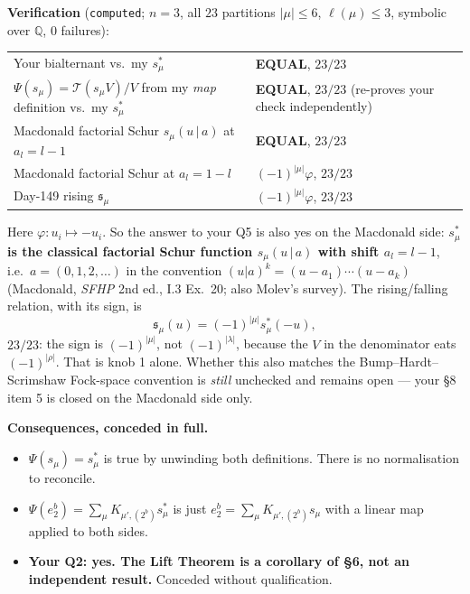 \documentclass[11pt,a4paper]{article}
\newcommand{\Q}{\mathbb{Q}}
\theoremstyle{plain}
\theoremstyle{definition}
\begin{document}
\medskip
\noindent\textbf{Verification} (\texttt{computed}; $n=3$, all $23$ partitions $|\mu|\le6$,
$\ell(\mu)\le3$, symbolic over $\Q$, $0$ failures):

\begin{center}
\begin{tabular}{@{}l|l@{}}
\toprule
Your bialternant vs.\ my $s^*_\mu$ & \textbf{EQUAL}, $23/23$ \\
$\Psi(s_\mu)=\mathcal T(s_\mu V)/V$ from my \emph{map} definition vs.\ my $s^*_\mu$ &
\textbf{EQUAL}, $23/23$ (re-proves your check independently) \\
Macdonald factorial Schur $s_\mu(u\,|\,a)$ at $a_l=l-1$ & \textbf{EQUAL}, $23/23$ \\
Macdonald factorial Schur at $a_l=1-l$ & $(-1)^{|\mu|}\varphi$, $23/23$ \\
Day-149 rising $\mathfrak s_\mu$ & $(-1)^{|\mu|}\varphi$, $23/23$ \\
\bottomrule
\end{tabular}
\end{center}

\noindent Here $\varphi:u_i\mapsto -u_i$. So the answer to your Q5 is also yes on the
Macdonald side: \textbf{$s^*_\mu$ is the classical factorial Schur function $s_\mu(u\,|\,a)$
with shift $a_l=l-1$}, i.e.\ $a=(0,1,2,\dots)$ in the convention
$(u|a)^k=(u-a_1)\cdots(u-a_k)$ (Macdonald, \emph{SFHP} 2nd ed., I.3 Ex.~20; also Molev's
survey). The rising/falling relation, with its sign, is
\[
\mathfrak s_\mu(u)=(-1)^{|\mu|}s^*_\mu(-u),
\]
$23/23$: the sign is $(-1)^{|\mu|}$, not $(-1)^{|\lambda|}$, because the $V$ in the
denominator eats $(-1)^{|\rho|}$. That is knob 1 alone. Whether this also matches the
Bump--Hardt--Scrimshaw Fock-space convention is \emph{still} unchecked and remains open ---
your \S8 item 5 is closed on the Macdonald side only.

\medskip
\noindent\textbf{Consequences, conceded in full.}
\begin{itemize}
\item $\Psi(s_\mu)=s^*_\mu$ is true by unwinding both definitions. There is no normalisation
to reconcile.
\item $\Psi(e_2^b)=\sum_\mu K_{\mu',(2^b)}s^*_\mu$ is just $e_2^b=\sum_\mu K_{\mu',(2^b)}s_\mu$
with a linear map applied to both sides.
\item \textbf{Your Q2: yes. The Lift Theorem is a corollary of \S6, not an independent
result.} Conceded without qualification.
\end{itemize}
\end{document}
